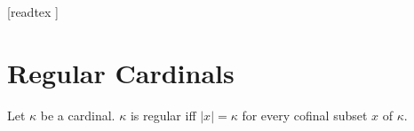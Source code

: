 \documentclass[10pt]{article}
\begin{document}
  \begin{imports}
    \begin{forthel}
      [readtex ]
    \end{forthel}
  \end{imports}


  \section*{Regular Cardinals}

  \begin{forthel}
    \begin{definition}[id=SET_THEORY_06_6532641205487950,printid]
      Let $\kappa$ be a cardinal.
      $\kappa$ is regular iff $|x| = \kappa$ for every cofinal subset $x$ of $\kappa$.
    \end{definition}
  \end{forthel}
\end{document}
